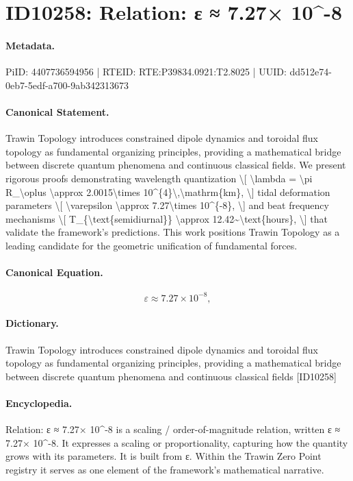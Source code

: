 \section*{ID10258: Relation: ε ≈ 7.27× 10\textasciicircum{}-8}
\paragraph{Metadata.}
PiID: 4407736594956 | RTEID: RTE:P39834.0921:T2.8025 | UUID: dd512e74-0eb7-5edf-a700-9ab342313673

\paragraph{Canonical Statement.}
Trawin Topology introduces constrained dipole dynamics and toroidal flux topology as fundamental organizing principles, providing a mathematical bridge between discrete quantum phenomena and continuous classical fields. We present rigorous proofs demonstrating wavelength quantization \textbackslash{}[ \textbackslash{}lambda = \textbackslash{}pi R\_\textbackslash{}oplus \textbackslash{}approx 2.0015\textbackslash{}times 10\textasciicircum{}\{4\}\textbackslash{},\textbackslash{}mathrm\{km\}, \textbackslash{}] tidal deformation parameters \textbackslash{}[ \textbackslash{}varepsilon \textbackslash{}approx 7.27\textbackslash{}times 10\textasciicircum{}\{-8\}, \textbackslash{}] and beat frequency mechanisms \textbackslash{}[ T\_\{\textbackslash{}text\{semidiurnal\}\} \textbackslash{}approx 12.42\textasciitilde{}\textbackslash{}text\{hours\}, \textbackslash{}] that validate the framework's predictions. This work positions Trawin Topology as a leading candidate for the geometric unification of fundamental forces.

\paragraph{Canonical Equation.}
\[
\varepsilon \approx 7.27\times 10^{-8},
\]

\paragraph{Dictionary.}
Trawin Topology introduces constrained dipole dynamics and toroidal flux topology as fundamental organizing principles, providing a mathematical bridge between discrete quantum phenomena and continuous classical fields [ID10258]

\paragraph{Encyclopedia.}
Relation: ε ≈ 7.27× 10\textasciicircum{}-8 is a scaling / order-of-magnitude relation, written ε ≈ 7.27× 10\textasciicircum{}-8. It expresses a scaling or proportionality, capturing how the quantity grows with its parameters. It is built from ε. Within the Trawin Zero Point registry it serves as one element of the framework's mathematical narrative.
